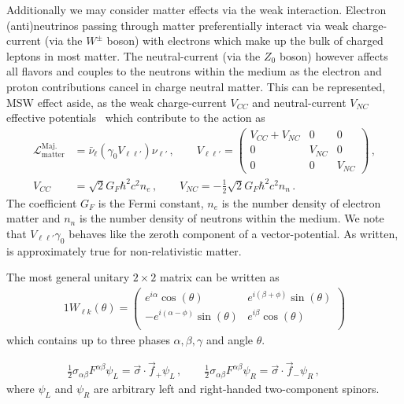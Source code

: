 Additionally we may consider matter effects via the weak interaction. Electron (anti)neutrinos passing through matter preferentially interact via weak charge-current (via the $W^{\pm}$ boson) with electrons which make up the bulk of charged leptons in most matter. The neutral-current (via the $Z_{0}$ boson) however affects all flavors and couples to the neutrons within the medium as the electron and proton contributions cancel in charge neutral matter. This can be represented, MSW effect aside, as the weak charge-current $V_{CC}$ and neutral-current $V_{NC}$ effective potentials~\cite{Pal:1991pm,greiner2009gauge} which contribute to the action as
\begin{align}
\label{matter:1}
\mathcal{L}_\mathrm{matter}^\mathrm{Maj.} &= \bar\nu_{\ell}(\gamma_{0}V_{\ell\ell'})\nu_{\ell'}\,,\qquad
V_{\ell\ell'} = 
\begin{pmatrix}
V_{CC}+V_{NC} & 0 & 0\\
0 & V_{NC} & 0\\
0 & 0 & V_{NC}
\end{pmatrix}\,,\\
V_{CC} &= \sqrt{2}G_{F}\hbar^{2}c^{2}n_{e}\,,\qquad V_{NC} = -\frac{1}{2}\sqrt{2}G_{F}\hbar^{2}c^{2}n_{n}\,.
\end{align}
The coefficient $G_{F}$ is the Fermi constant, $n_{e}$ is the number density of electron matter and $n_{n}$ is the number density of neutrons within the medium. We note that $V_{\ell\ell'}\gamma_{0}$ behaves like the zeroth component of a vector-potential. As written,  is approximately true for non-relativistic matter.



The most general unitary $2\times2$ matrix can be written as
\begin{alignat}{1}
	\label{mix:4} W_{\ell k}(\theta) = 
    \left(
    \begin{array}{cc}
         e^{i \alpha } \cos (\theta ) & e^{i (\beta +\phi )} \sin (\theta ) \\
         -e^{i (\alpha -\phi )} \sin (\theta ) & e^{i \beta } \cos (\theta ) \\
    \end{array}
    \right)
\end{alignat}
which contains up to three phases $\alpha,\beta,\gamma$ and angle $\theta$.




 \begin{align}
    \label{chiral:1b}
   \frac{1}{2}\sigma_{\alpha\beta}F^{\alpha\beta}\psi_{L} = \vec{\sigma}\cdot\vec{f}_{+}\psi_{L}\,,\qquad
    \frac{1}{2}\sigma_{\alpha\beta}F^{\alpha\beta}\psi_{R} = \vec{\sigma}\cdot\vec{f}_{-}\psi_{R}\,,\qquad
\end{align}
where $\psi_{L}$ and $\psi_{R}$ are arbitrary left and right-handed two-component spinors.




